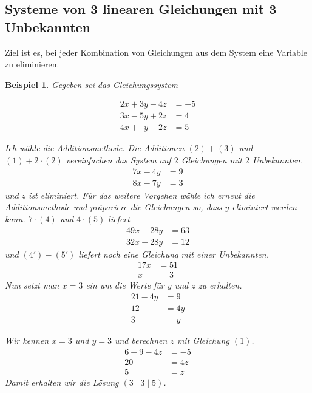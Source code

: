 \documentclass[%
11pt,%
twoside,%
titlepage,%
swissgerman,%
headsepline%
]{scrartcl}
\theoremstyle{definition}
\newtheorem{bsp}{Beispiel}[subsection] %
\theoremstyle{plain}
\newtheorem{bsp}{Beispiel}[subsection] %
\theoremstyle{plain}
\begin{document}
	\subsection{Systeme von 3 linearen Gleichungen mit 3 Unbekannten}
	
	Ziel ist es, bei jeder Kombination von Gleichungen aus dem System eine Variable zu eliminieren.
	\begin{bsp}
		
		Gegeben sei das Gleichungssystem
		
		\begin{align}
			2x+3y-4z&=-5\tag{1}\\
			3x-5y+2z&=4\tag{2}\\
			4x+\phantom{1}y-2z&=5\tag{3}
		\end{align}
		
		Ich wähle die Additionsmethode. Die Additionen $(2)+(3)$ und $(1)+2\cdot(2)$ vereinfachen das System auf $2$ Gleichungen mit $2$ Unbekannten.
		\begin{align}
			7x-4y&=9\tag{4}\\
			8x-7y&=3\tag{5}
		\end{align}
		und $z$ ist eliminiert. Für das weitere Vorgehen wähle ich erneut die Additionsmethode und präpariere die Gleichungen so, dass $y$ eliminiert werden kann. $7\cdot(4)$ und $4\cdot(5)$ liefert
		\begin{align}
			49x-28y&=63\tag{4'}\\
			32x-28y&=12\tag{5'}
		\end{align}
		und $(4')-(5')$ liefert noch eine Gleichung mit einer Unbekannten.
		\begin{align}
			17x&=51\tag{$\div17$}\\
			x&=3\tag{6}
		\end{align}
		Nun setzt man $x=3$ ein um die Werte für $y$ und $z$ zu erhalten.
		\begin{align}
			21-4y&=9\tag{6) in (4}\\
			12&=4y\tag{$\div4$}\\
			3&=y\tag{7}
		\end{align}
		
		Wir kennen $x=3$ und $y=3$ und berechnen $z$ mit Gleichung $(1)$.
		\begin{align}
			6+9-4z&=-5\tag{6) und (7) in (1}\\
			20&=4z\tag{$\div4$}\\
			5&=z\tag{8}
		\end{align}
		Damit erhalten wir die Lösung $(3\mid 3\mid 5)$.
	\end{bsp}
	
\end{document}
